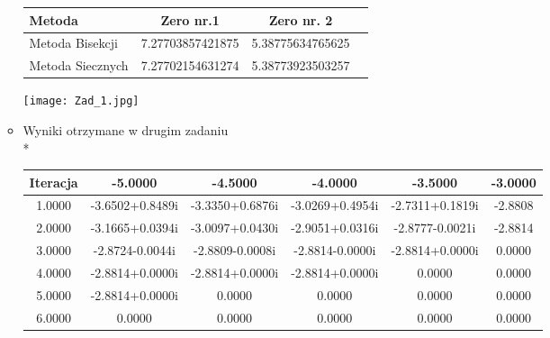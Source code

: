 \documentclass[a4paper, 11pt]{article}
\begin{document}
\begin{enumerate}
\begin{itemize}
\begin{center}
	\begin{tabular}{ l*{2}{c}r}
  \hline	
	Metoda & Zero nr.1 & Zero nr. 2 \\ \hline
    Metoda Bisekcji & 7.27703857421875	& 5.38775634765625	\\
    Metoda Siecznych & 7.27702154631274	& 5.38773923503257 \\
  \hline
  \end{tabular}

\end{center}
\texttt{[image: Zad\_1.jpg]}
\item Wyniki otrzymane w drugim zadaniu \\* 
\begin{table}    
\begin{center}                                                                          
\centering                                                                                 
\begin{tabular}{|c|c|c|c|c|c|}                                                             
\hline                                                                                     
Iteracja & -5.0000 & -4.5000 & -4.0000 & -3.5000 & -3.0000 \\                                
\hline                                                                                     
1.0000 & -3.6502+0.8489i & -3.3350+0.6876i & -3.0269+0.4954i & -2.7311+0.1819i & -2.8808 \\
\hline                                                                                     
2.0000 & -3.1665+0.0394i & -3.0097+0.0430i & -2.9051+0.0316i & -2.8777-0.0021i & -2.8814 \\
\hline                                                                                     
3.0000 & -2.8724-0.0044i & -2.8809-0.0008i & -2.8814-0.0000i & -2.8814+0.0000i & 0.0000 \\ 
\hline                                                                                     
4.0000 & -2.8814+0.0000i & -2.8814+0.0000i & -2.8814+0.0000i & 0.0000 & 0.0000 \\          
\hline                                                                                     
5.0000 & -2.8814+0.0000i & 0.0000 & 0.0000 & 0.0000 & 0.0000 \\                            
\hline                                                                                     
6.0000 & 0.0000 & 0.0000 & 0.0000 & 0.0000 & 0.0000 \\                                     

\end{tabular}
\end{center}
\end{table}
\end{itemize}
\end{enumerate}
\end{document}
